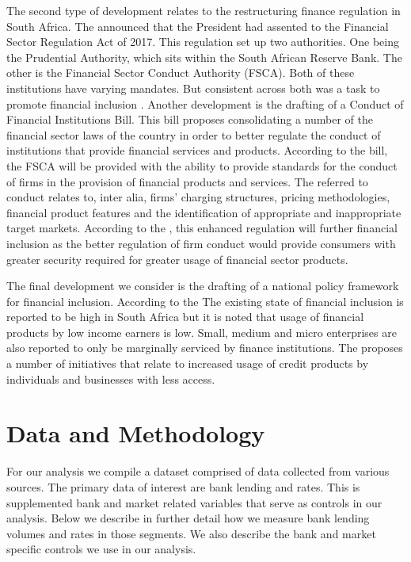 \documentclass[
  letterpaper,
  DIV=11,
  numbers=noendperiod]{scrartcl}
\begin{document}
The second type of development relates to the restructuring finance
regulation in South Africa. The \citet{fsr2017} announced that the
President had assented to the Financial Sector Regulation Act of 2017.
This regulation set up two authorities. One being the Prudential
Authority, which sits within the South African Reserve Bank. The other
is the Financial Sector Conduct Authority (FSCA). Both of these
institutions have varying mandates. But consistent across both was a
task to promote financial inclusion \citep{fsr2017}. Another development
is the drafting of a Conduct of Financial Institutions Bill. This bill
proposes consolidating a number of the financial sector laws of the
country in order to better regulate the conduct of institutions that
provide financial services and products. According to the bill, the FSCA
will be provided with the ability to provide standards for the conduct
of firms in the provision of financial products and services. The
referred to conduct relates to, inter alia, firms' charging structures,
pricing methodologies, financial product features and the identification
of appropriate and inappropriate target markets. According to the
\citet{cofi2018b}, this enhanced regulation will further financial
inclusion as the better regulation of firm conduct would provide
consumers with greater security required for greater usage of financial
sector products.

The final development we consider is the drafting of a national policy
framework for financial inclusion. According to the \citet{nt2020} The
existing state of financial inclusion is reported to be high in South
Africa but it is noted that usage of financial products by low income
earners is low. Small, medium and micro enterprises are also reported to
only be marginally serviced by finance institutions. The \citet{nt2020}
proposes a number of initiatives that relate to increased usage of
credit products by individuals and businesses with less access.

\section{Data and Methodology}\label{data-and-methodology}

For our analysis we compile a dataset comprised of data collected from
various sources. The primary data of interest are bank lending and
rates. This is supplemented bank and market related variables that serve
as controls in our analysis. Below we describe in further detail how we
measure bank lending volumes and rates in those segments. We also
describe the bank and market specific controls we use in our analysis.
\end{document}
